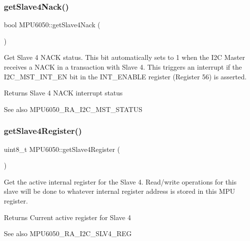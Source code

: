 \subsubsection{\texorpdfstring{getSlave4Nack()}{getSlave4Nack()}}
{\footnotesize\ttfamily bool M\+P\+U6050\+::get\+Slave4\+Nack (\begin{DoxyParamCaption}{ }\end{DoxyParamCaption})}

Get Slave 4 N\+A\+CK status. This bit automatically sets to 1 when the I2C Master receives a N\+A\+CK in a transaction with Slave 4. This triggers an interrupt if the I2\+C\+\_\+\+M\+S\+T\+\_\+\+I\+N\+T\+\_\+\+EN bit in the I\+N\+T\+\_\+\+E\+N\+A\+B\+LE register (Register 56) is asserted. \begin{DoxyReturn}{Returns}
Slave 4 N\+A\+CK interrupt status 
\end{DoxyReturn}
\begin{DoxySeeAlso}{See also}
M\+P\+U6050\+\_\+\+R\+A\+\_\+\+I2\+C\+\_\+\+M\+S\+T\+\_\+\+S\+T\+A\+T\+US 
\end{DoxySeeAlso}
\mbox{\label{class_m_p_u6050_a7bd548cb60ecceb27c72f026ec0a60f8}} 
\subsubsection{\texorpdfstring{getSlave4Register()}{getSlave4Register()}}
{\footnotesize\ttfamily uint8\+\_\+t M\+P\+U6050\+::get\+Slave4\+Register (\begin{DoxyParamCaption}{ }\end{DoxyParamCaption})}

Get the active internal register for the Slave 4. Read/write operations for this slave will be done to whatever internal register address is stored in this M\+PU register.

\begin{DoxyReturn}{Returns}
Current active register for Slave 4 
\end{DoxyReturn}
\begin{DoxySeeAlso}{See also}
M\+P\+U6050\+\_\+\+R\+A\+\_\+\+I2\+C\+\_\+\+S\+L\+V4\+\_\+\+R\+EG 
\end{DoxySeeAlso}
\mbox{\label{class_m_p_u6050_a8d5a5e73907c78960154b92656127372}} 
